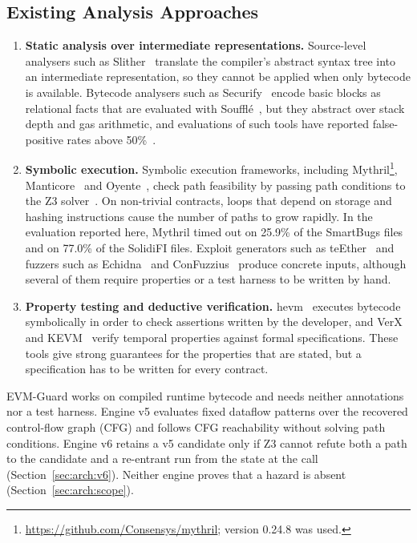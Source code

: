 \documentclass[pdflatex,sn-mathphys]{sn-jnl}
\theoremstyle{thmstyletwo}
\theoremstyle{thmstyletwo}
\begin{document}
\subsection{Existing Analysis Approaches}\label{sec:intro:approaches}
\begin{enumerate}
    \item \textbf{Static analysis over intermediate representations.} Source-level analysers such as Slither~\cite{feist2019slither} translate the compiler's abstract syntax tree into an intermediate representation, so they cannot be applied when only bytecode is available. Bytecode analysers such as Securify~\cite{tsankov2018securify} encode basic blocks as relational facts that are evaluated with Souffl{\'e}~\cite{scholz2016souffle}, but they abstract over stack depth and gas arithmetic, and evaluations of such tools have reported false-positive rates above 50\%~\cite{durieux2020empirical,ghaleb2020how}.
    \item \textbf{Symbolic execution.} Symbolic execution frameworks, including Mythril\footnote{\url{https://github.com/Consensys/mythril}; version 0.24.8 was used.}, Manticore~\cite{mossberg2019manticore} and Oyente~\cite{luu2016making}, check path feasibility by passing path conditions to the Z3 solver~\cite{de2008z3}. On non-trivial contracts, loops that depend on storage and hashing instructions cause the number of paths to grow rapidly. In the evaluation reported here, Mythril timed out on 25.9\% of the SmartBugs files and on 77.0\% of the SolidiFI files. Exploit generators such as teEther~\cite{krupp2018teether} and fuzzers such as Echidna~\cite{grieco2020echidna} and ConFuzzius~\cite{torres2021confuzzius} produce concrete inputs, although several of them require properties or a test harness to be written by hand.
    \item \textbf{Property testing and deductive verification.} hevm~\cite{dxo2024hevm} executes bytecode symbolically in order to check assertions written by the developer, and VerX~\cite{permenev2020verx} and KEVM~\cite{hildenbrandt2018kevm} verify temporal properties against formal specifications. These tools give strong guarantees for the properties that are stated, but a specification has to be written for every contract.
\end{enumerate}
EVM-Guard works on compiled runtime bytecode and needs neither annotations nor a test harness. Engine v5 evaluates fixed dataflow patterns over the recovered control-flow graph (CFG) and follows CFG reachability without solving path conditions. Engine v6 retains a v5 candidate only if Z3 cannot refute both a path to the candidate and a re-entrant run from the state at the call (Section~\ref{sec:arch:v6}). Neither engine proves that a hazard is absent (Section~\ref{sec:arch:scope}).
\end{document}
